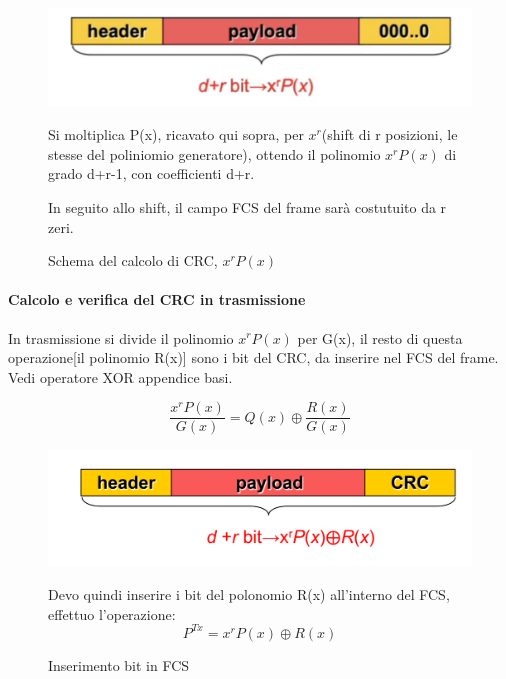 \begin{figure}[htbp]
    \centering
   \begin{minipage}{0.5\textwidth}
        \includegraphics[width=\linewidth]{images/crcricezione.png}
        \caption{Schema del calcolo di CRC, $x^rP(x)$}
    \end{minipage}
    \hfill
     \begin{minipage}{0.45\textwidth}
        Si moltiplica P(x), ricavato qui sopra, per $x^r$(shift di r posizioni, le stesse del poliniomio generatore), ottendo il polinomio $x^rP(x)$ di grado d+r-1, con coefficienti d+r.
      
        In seguito allo shift, il campo FCS del frame sarà costutuito da r zeri.
    \end{minipage}%
\end{figure}

\paragraph{Calcolo e verifica del CRC in trasmissione}
In trasmissione si divide il polinomio $x^rP(x)$ per G(x), il resto di questa operazione[il polinomio R(x)] sono i bit del CRC, da inserire nel FCS del frame.
Vedi operatore XOR appendice basi.

\begin{equation}
    \frac{x^rP(x)}{G(x)} = Q(x) \oplus \frac{R(x)}{G(x)}
\end{equation}


\begin{figure}[htbp]
    \centering
    \begin{minipage}{0.45\textwidth}
        \includegraphics[width=\linewidth]{images/calcolocrc.png}
        \caption{Inserimento bit in FCS}
        \label{fig:calcolo-crc}
    \end{minipage}%
    \hfill
    \begin{minipage}{0.5\textwidth}
        Devo quindi inserire i bit del polonomio R(x) all'interno del FCS, effettuo l'operazione:
\begin{equation}
    P^{Tx} = x^rP(x) \oplus R(x)
\end{equation}
    \end{minipage}
\end{figure}
\newpage
